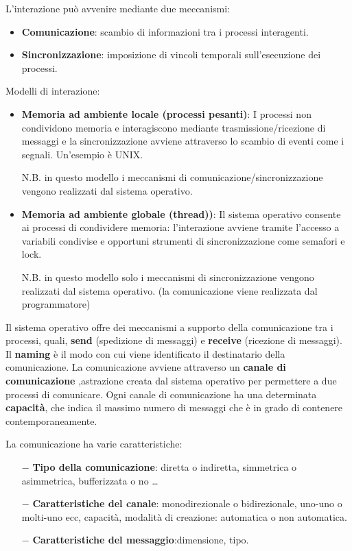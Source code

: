 \documentclass{article}
\begin{document}
\noindent L'interazione può avvenire mediante due meccanismi:
\begin{itemize}
    \item \textbf{Comunicazione}: scambio di informazioni tra i 
    processi interagenti.
    \item \textbf{Sincronizzazione}: imposizione di vincoli 
    temporali sull'esecuzione dei processi.
\end{itemize}
\noindent Modelli di interazione:
    \begin{itemize}
    \item \textbf{Memoria ad ambiente locale (processi pesanti)}:
    I processi non condividono memoria e interagiscono mediante
    trasmissione/ricezione di messaggi e la sincronizzazione avviene
     attraverso lo scambio di eventi come i segnali. Un'esempio è UNIX.
     \medskip

    N.B. in questo modello i meccanismi di comunicazione/sincronizzazione
    vengono realizzati dal sistema operativo.

    \item \textbf{Memoria ad ambiente globale (thread))}: Il sistema 
    operativo consente ai processi di condividere memoria: 
    l'interazione avviene tramite l'accesso a variabili condivise e
    opportuni strumenti di sincronizzazione come semafori e lock.
    \medskip

    N.B. in questo modello solo i meccanismi di sincronizzazione 
    vengono realizzati dal sistema operativo. (la comunicazione
     viene realizzata dal programmatore)
\end{itemize}

\noindent Il sistema operativo offre dei meccanismi a supporto della 
comunicazione tra i processi, quali, \textbf{send} (spedizione di messaggi) 
e \textbf{receive} (ricezione di messaggi). Il \textbf{naming} è il 
modo con cui viene identificato il destinatario della comunicazione.
La comunicazione avviene attraverso un \textbf{canale di comunicazione} 
,astrazione creata dal sistema operativo per permettere a due
processi di comunicare. Ogni canale di comunicazione ha una determinata
\textbf{capacità}, che indica il massimo numero di messaggi che è
in grado di contenere contemporaneamente.

\noindent La comunicazione ha varie caratteristiche:
\begin{itemize}
    \item[$-$] \textbf{Tipo della comunicazione}: diretta o
    indiretta, simmetrica o asimmetrica, bufferizzata o no \dots
    \item[$-$] \textbf{Caratteristiche del canale}: monodirezionale o
    bidirezionale, uno-uno o molti-uno ecc, capacità, modalità di creazione:
    automatica o non automatica.
    \item[$-$] \textbf{Caratteristiche del messaggio}:dimensione, tipo. 
\end{itemize}
\end{document}
